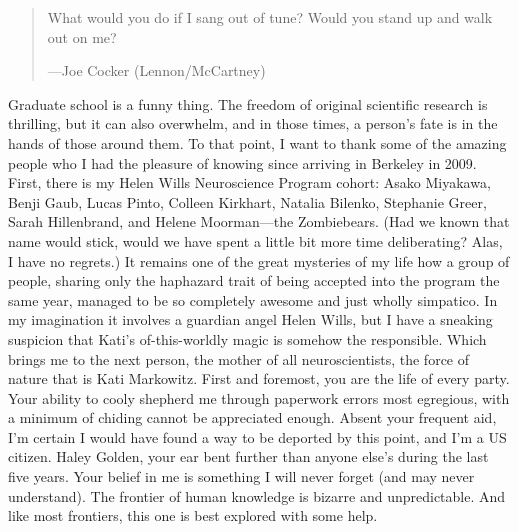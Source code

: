 \documentclass{ucbthesis}
\begin{document}
\begin{frontmatter}
\begin{acknowledgements}
\begin{quotation}
What would you do if I sang out of tune? Would you stand up and walk out on me?
\begin{flushright}
 ---Joe Cocker (Lennon/McCartney)
\end{flushright}
\end{quotation}
\vfil\nul
Graduate school is a funny thing. The freedom of original scientific research is thrilling, but it can also overwhelm, and in those times, a person's fate is in the hands of those around them. To that point, I want to thank some of the amazing people who I had the pleasure of knowing since arriving in Berkeley in 2009. First, there is my Helen Wills Neuroscience Program cohort: Asako Miyakawa, Benji Gaub, Lucas Pinto, Colleen Kirkhart, Natalia Bilenko, Stephanie Greer, Sarah Hillenbrand, and Helene Moorman---the Zombiebears. (Had we known that name would stick, would we have spent a little bit more time deliberating? Alas, I have no regrets.) It remains one of the great mysteries of my life how a group of people, sharing only the haphazard trait of being accepted into the program the same year, managed to be so completely awesome and just wholly simpatico. In my imagination it involves a guardian angel Helen Wills, but I have a sneaking suspicion that Kati's of-this-worldly magic is somehow the responsible. Which brings me to the next person, the mother of all neuroscientists, the force of nature that is Kati Markowitz. First and foremost, you are the life of every party. Your ability to cooly shepherd me through paperwork errors most egregious, with a minimum of chiding cannot be appreciated enough. Absent your frequent aid, I'm certain I would have found a way to be deported by this point, and I'm a US citizen. Haley Golden, your ear bent further than anyone else's during the last five years. Your belief in me is something I will never forget (and may never understand). The frontier of human knowledge is bizarre and unpredictable. And like most frontiers, this one is best explored with some help.



\end{acknowledgements}

\end{frontmatter}

\pagestyle{headings}







\printbibliography
\end{document}
